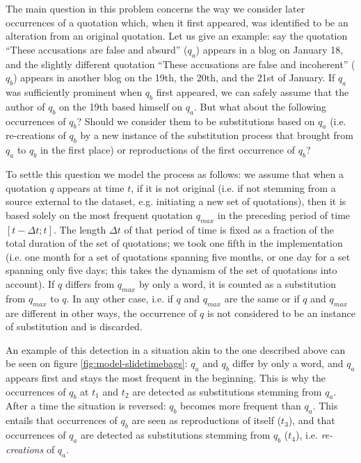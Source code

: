 The main question in this problem concerns the way we consider later occurrences of a quotation which, when it first appeared, was identified to be an alteration from an original quotation.
Let us give an example: say the quotation ``These accusations are false and absurd'' ($q_a$) appears in a blog on January 18, and the slightly different quotation ``These accusations are false and incoherent'' ($q_b$) appears in another blog on the 19th, the 20th, and the 21st of January.
If $q_a$ was sufficiently prominent when $q_b$ first appeared, we can safely assume that the author of $q_b$ on the 19th based himself on $q_a$.
But what about the following occurrences of $q_b$?
Should we consider them to be substitutions based on $q_a$ (i.e. re-creations of $q_b$ by a new instance of the substitution process that brought from $q_a$ to $q_b$ in the first place) or reproductions of the first occurrence of $q_b$?

To settle this question we model the process as follows: we assume that when a quotation $q$ appears at time $t$, if it is not original (i.e. if not stemming from a source external to the dataset, e.g. initiating a new set of quotations), then it is based solely on the most frequent quotation $q_{max}$ in the preceding period of time $[t - \Delta t ; t]$.
The length $\Delta t$ of that period of time is fixed as a fraction of the total duration of the set of quotations; we took one fifth in the implementation (i.e. one month for a set of quotations spanning five months, or one day for a set spanning only five days; this takes the dynamism of the set of quotations into account).
If $q$ differs from $q_{max}$ by only a word, it is counted as a substitution from $q_{max}$ to $q$. In any other case, i.e. if $q$ and $q_{max}$ are the same or if $q$ and $q_{max}$ are different in other ways, the occurrence of $q$ is not considered to be an instance of substitution and is discarded.

An example of this detection in a situation akin to the one described above can be seen on figure \ref{fig:model-slidetimebags}: $q_a$ and $q_b$ differ by only a word, and $q_a$ appears first and stays the most frequent in the beginning.
This is why the occurrences of $q_b$ at $t_1$ and $t_2$ are detected as substitutions stemming from $q_a$.
After a time the situation is reversed: $q_b$ becomes more frequent than $q_a$.
This entails that occurrences of $q_b$ are seen as reproductions of itself ($t_3$), and that occurrences of $q_a$ are detected as substitutions stemming from $q_b$ ($t_4$), i.e. \emph{re-creations} of $q_a$.

